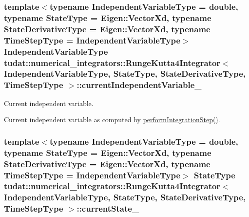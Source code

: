 \subsubsection[{\texorpdfstring{current\+Independent\+Variable\+\_\+}{currentIndependentVariable_}}]{\setlength{\rightskip}{0pt plus 5cm}template$<$typename Independent\+Variable\+Type  = double, typename State\+Type  = Eigen\+::\+Vector\+Xd, typename State\+Derivative\+Type  = Eigen\+::\+Vector\+Xd, typename Time\+Step\+Type  = Independent\+Variable\+Type$>$ Independent\+Variable\+Type {\bf tudat\+::numerical\+\_\+integrators\+::\+Runge\+Kutta4\+Integrator}$<$ Independent\+Variable\+Type, State\+Type, State\+Derivative\+Type, Time\+Step\+Type $>$\+::current\+Independent\+Variable\+\_\+\hspace{0.3cm}{\ttfamily [protected]}}\hypertarget{classtudat_1_1numerical__integrators_1_1RungeKutta4Integrator_acff656a92bdf99fac8e9164678f826b8}{}\label{classtudat_1_1numerical__integrators_1_1RungeKutta4Integrator_acff656a92bdf99fac8e9164678f826b8}


Current independent variable. 

Current independent variable as computed by \hyperlink{classtudat_1_1numerical__integrators_1_1RungeKutta4Integrator_abaa09d78b7b023d900cecb8fcbdcdca6}{perform\+Integration\+Step()}. 
\subsubsection[{\texorpdfstring{current\+State\+\_\+}{currentState_}}]{\setlength{\rightskip}{0pt plus 5cm}template$<$typename Independent\+Variable\+Type  = double, typename State\+Type  = Eigen\+::\+Vector\+Xd, typename State\+Derivative\+Type  = Eigen\+::\+Vector\+Xd, typename Time\+Step\+Type  = Independent\+Variable\+Type$>$ State\+Type {\bf tudat\+::numerical\+\_\+integrators\+::\+Runge\+Kutta4\+Integrator}$<$ Independent\+Variable\+Type, State\+Type, State\+Derivative\+Type, Time\+Step\+Type $>$\+::current\+State\+\_\+\hspace{0.3cm}{\ttfamily [protected]}}\hypertarget{classtudat_1_1numerical__integrators_1_1RungeKutta4Integrator_a5baed5beb7ead145c26e8de0d85345dd}{}\label{classtudat_1_1numerical__integrators_1_1RungeKutta4Integrator_a5baed5beb7ead145c26e8de0d85345dd}


